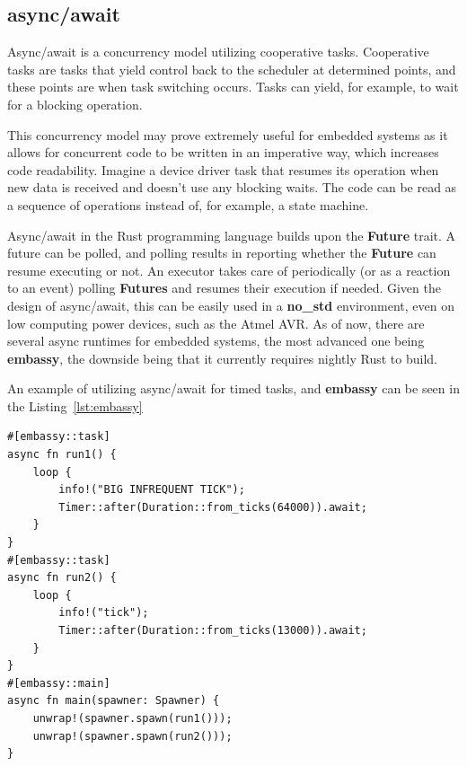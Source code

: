 \subsection{async/await}
\label{subsec:async}
Async/await is a concurrency model utilizing cooperative tasks.
Cooperative tasks are tasks that yield control back to the scheduler at determined points\cite{aparicio_concurrency_nodate}, and these points are when task switching occurs.
Tasks can yield, for example, to wait for a blocking operation.

This concurrency model may prove extremely useful for embedded systems as it allows for concurrent code to be written in an imperative way, which increases code readability.
Imagine a device driver task that resumes its operation when new data is received and doesn't use any blocking waits.
The code can be read as a sequence of operations instead of, for example, a state machine.

Async/await in the Rust programming language builds upon the \textbf{Future} trait.
A future can be polled, and polling results in reporting whether the \textbf{Future} can resume executing or not.
An executor takes care of periodically (or as a reaction to an event) polling \textbf{Futures} and resumes their execution if needed.
Given the design of async/await, this can be easily used in a \textbf{no\_std} environment, even on low computing power devices, such as the Atmel AVR\cite{schattinger_asyncawait_2020}.
As of now, there are several async runtimes for embedded systems, the most advanced one being \textbf{embassy}, the downside being that it currently requires nightly Rust to build.

An example of utilizing async/await for timed tasks, and \textbf{embassy} can be seen in the Listing~\ref{lst:embassy}

\begin{lstlisting}[caption={Timed tasks using async/await and embassy\cite{noauthor_embassy-rsembassy_2021}.},label=lst:embassy]
#[embassy::task]
async fn run1() {
    loop {
        info!("BIG INFREQUENT TICK");
        Timer::after(Duration::from_ticks(64000)).await;
    }
}
#[embassy::task]
async fn run2() {
    loop {
        info!("tick");
        Timer::after(Duration::from_ticks(13000)).await;
    }
}
#[embassy::main]
async fn main(spawner: Spawner) {
    unwrap!(spawner.spawn(run1()));
    unwrap!(spawner.spawn(run2()));
}
\end{lstlisting}

